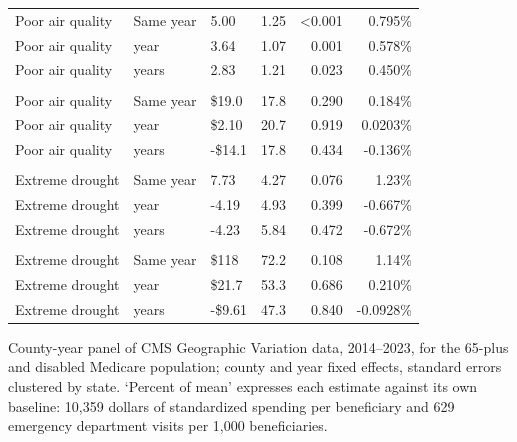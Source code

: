 \begin{longtable}{>{\raggedright\arraybackslash}p{12.70cm} >{\raggedright\arraybackslash}p{2cm} l r r r}
Poor air quality & Same year & 5.00 & 1.25 & \textless{}0.001 & 0.795\% \\
Poor air quality & 1 year & 3.64 & 1.07 & 0.001 & 0.578\% \\
Poor air quality & 2 years & 2.83 & 1.21 & 0.023 & 0.450\% \\
\addlinespace
\multicolumn{6}{l}{\textit{Standardized spending per beneficiary}} \\
Poor air quality & Same year & \$19.0 & 17.8 & 0.290 & 0.184\% \\
Poor air quality & 1 year & \$2.10 & 20.7 & 0.919 & 0.0203\% \\
Poor air quality & 2 years & -\$14.1 & 17.8 & 0.434 & -0.136\% \\
\addlinespace
\multicolumn{6}{l}{\textit{Emergency department visits per 1,000}} \\
Extreme drought & Same year & 7.73 & 4.27 & 0.076 & 1.23\% \\
Extreme drought & 1 year & -4.19 & 4.93 & 0.399 & -0.667\% \\
Extreme drought & 2 years & -4.23 & 5.84 & 0.472 & -0.672\% \\
\addlinespace
\multicolumn{6}{l}{\textit{Standardized spending per beneficiary}} \\
Extreme drought & Same year & \$118 & 72.2 & 0.108 & 1.14\% \\
Extreme drought & 1 year & \$21.7 & 53.3 & 0.686 & 0.210\% \\
Extreme drought & 2 years & -\$9.61 & 47.3 & 0.840 & -0.0928\% \\
\end{longtable}
\vspace{-0.6em}\begin{minipage}{\textwidth}\footnotesize
County-year panel of CMS Geographic Variation data, 2014--2023, for the 65-plus and disabled Medicare population; county and year fixed effects, standard errors clustered by state. `Percent of mean' expresses each estimate against its own baseline: 10,359 dollars of standardized spending per beneficiary and 629 emergency department visits per 1,000 beneficiaries.
\end{minipage}
\endgroup
